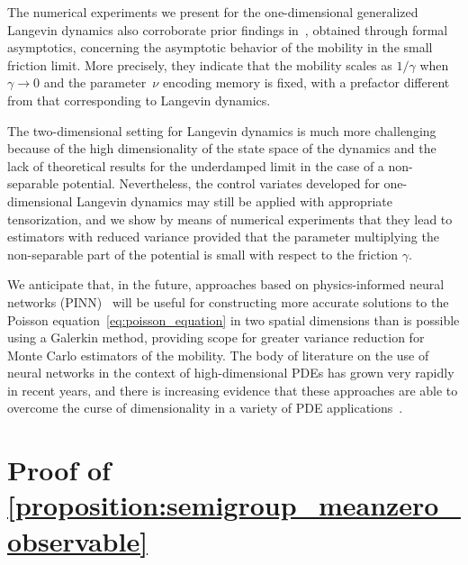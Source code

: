 \documentclass[11pt,a4paper]{article}
\begin{document}
The numerical experiments we present for the one-dimensional generalized Langevin dynamics also corroborate prior findings in~\cite{GPGSUV21},
obtained through formal asymptotics,
concerning the asymptotic behavior of the mobility in the small friction limit.
More precisely, they indicate that the mobility scales as $1/\gamma$ when $\gamma \to 0$ and the parameter~$\nu$ encoding memory is fixed,
with a prefactor different from that corresponding to Langevin dynamics.

The two-dimensional setting for Langevin dynamics is much more challenging because of the high dimensionality of the state space of the dynamics
and the lack of theoretical results for the underdamped limit in the case of a non-separable potential.
Nevertheless, the control variates developed for one-dimensional Langevin dynamics may still be applied with appropriate tensorization,
and we show by means of numerical experiments that
they lead to estimators with reduced variance provided that
the parameter multiplying the non-separable part of the potential is small with respect to the friction $\gamma$.

We anticipate that, in the future,
approaches based on physics-informed neural networks (PINN)~\cite{MR3759415,MR3881695} will be useful for constructing more accurate solutions to the Poisson equation~\eqref{eq:poisson_equation} in two spatial dimensions than is possible using a Galerkin method,
providing scope for greater variance reduction for Monte Carlo estimators of the mobility.
The body of literature on the use of neural networks in the context of high-dimensional PDEs has grown very rapidly in recent years,
and there is increasing evidence that these approaches are able to overcome the curse of dimensionality in a variety of PDE applications~\cite{MR3847747,MR4338293,2018arXiv180907321J,2019arXiv190810828G,2019arXiv190110854H,2021arXiv210614473D,MR4203091,pmlr-v145-zhai22a}.

\appendix
\section{Proof of \texorpdfstring{\cref{proposition:semigroup_meanzero_observable}}{Proposition 2.1}}%
\label{sec:auxiliary_technical_results}
\end{document}
